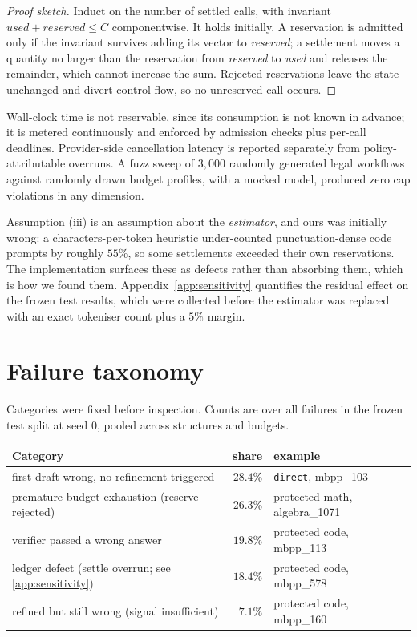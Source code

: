 \documentclass{article}
\begin{document}
\begin{proof}[Proof sketch]
Induct on the number of settled calls, with invariant
$\textit{used} + \textit{reserved} \le C$ componentwise. It holds initially.
A reservation is admitted only if the invariant survives adding its vector to
\textit{reserved}; a settlement moves a quantity no larger than the reservation
from \textit{reserved} to \textit{used} and releases the remainder, which cannot
increase the sum. Rejected reservations leave the state unchanged and divert
control flow, so no unreserved call occurs.
\end{proof}

Wall-clock time is not reservable, since its consumption is not known in
advance; it is metered continuously and enforced by admission checks plus
per-call deadlines. Provider-side cancellation latency is reported separately
from policy-attributable overruns. A fuzz sweep of $3{,}000$ randomly generated
legal workflows against randomly drawn budget profiles, with a mocked model,
produced zero cap violations in any dimension.

Assumption (iii) is an assumption about the \emph{estimator}, and ours was
initially wrong: a characters-per-token heuristic under-counted
punctuation-dense code prompts by roughly $55\%$, so some settlements exceeded
their own reservations. The implementation surfaces these as defects rather than
absorbing them, which is how we found them.
Appendix~\ref{app:sensitivity} quantifies the residual effect on the frozen test
results, which were collected before the estimator was replaced with an exact
tokeniser count plus a $5\%$ margin.

\section{Failure taxonomy}
\label{app:failures}

Categories were fixed before inspection. Counts are over all failures in the
frozen test split at seed 0, pooled across structures and budgets.

\begin{center}
\small
\begin{tabular}{lrl}
\toprule
Category & share & example \\
\midrule
first draft wrong, no refinement triggered & $28.4\%$ & \texttt{direct}, mbpp\_103 \\
premature budget exhaustion (reserve rejected) & $26.3\%$ & protected math, algebra\_1071 \\
verifier passed a wrong answer & $19.8\%$ & protected code, mbpp\_113 \\
ledger defect (settle overrun; see \ref{app:sensitivity}) & $18.4\%$ & protected code, mbpp\_578 \\
refined but still wrong (signal insufficient) & $7.1\%$ & protected code, mbpp\_160 \\
\bottomrule
\end{tabular}
\end{center}
\end{document}
